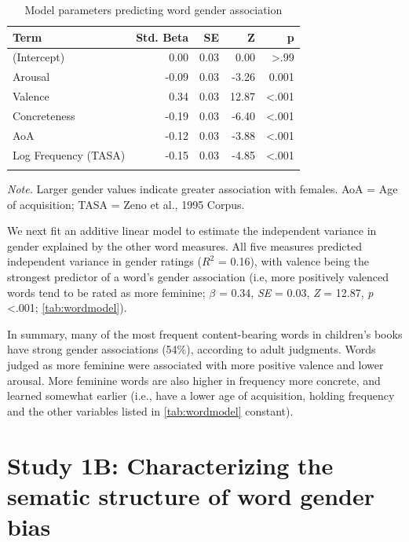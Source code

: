 \documentclass[english,,man,floatsintext]{apa6}
\begin{document}
\begin{table}[tbp]
\begin{center}
\begin{threeparttable}
\caption{\label{tab:wordmodel}Model parameters predicting word gender association}
\begin{tabular}{lrrrr}
\toprule
Term & Std. Beta & SE & Z & p\\
\midrule
(Intercept) & 0.00 & 0.03 & 0.00 & >.99\\
Arousal & -0.09 & 0.03 & -3.26 & 0.001\\
Valence & 0.34 & 0.03 & 12.87 & <.001\\
Concreteness & -0.19 & 0.03 & -6.40 & <.001\\
AoA & -0.12 & 0.03 & -3.88 & <.001\\
Log Frequency (TASA) & -0.15 & 0.03 & -4.85 & <.001\\
\bottomrule
\addlinespace
\end{tabular}
\begin{tablenotes}[para]
\normalsize{\textit{Note.} Larger gender values indicate greater association with females. AoA = Age of acquisition;  TASA = Zeno et al., 1995 Corpus.}
\end{tablenotes}
\end{threeparttable}
\end{center}
\end{table}

We next fit an additive linear model to estimate the independent variance in gender explained by the other word measures. All five measures predicted independent variance in gender ratings (\(R^2\) = 0.16), with valence being the strongest predictor of a word's gender association (i.e, more positively valenced words tend to be rated as more feminine; \(\beta\) = 0.34, \emph{SE} = 0.03, \emph{Z} = 12.87, \emph{p} \textless.001; \autoref{tab:wordmodel}).

In summary, many of the most frequent content-bearing words in children's books have strong gender associations (54\%), according to adult judgments. Words judged as more feminine were associated with more positive valence and lower arousal. More feminine words are also higher in frequency more concrete, and learned somewhat earlier (i.e., have a lower age of acquisition, holding frequency and the other variables listed in \autoref{tab:wordmodel} constant).

\hypertarget{study-1b-characterizing-the-sematic-structure-of-word-gender-bias}{%
\section{Study 1B: Characterizing the sematic structure of word gender bias}\label{study-1b-characterizing-the-sematic-structure-of-word-gender-bias}}
\end{document}
